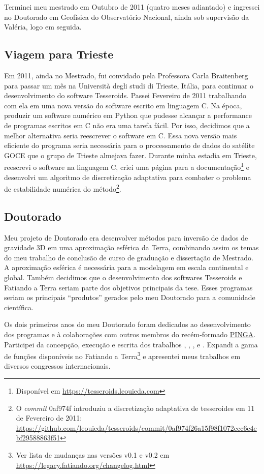 \documentclass[12pt,a4paper,oneside]{book}
\newcommand{\ON}{Observatório Nacional}
\newcommand{\Trieste}{Università degli studi di Trieste}
\begin{document}
Terminei meu mestrado em Outubro de 2011 (quatro meses adiantado) e ingressei
no Doutorado em Geofísica do \ON{}, ainda sob supervisão da
Valéria, logo em seguida.

\subsection{Viagem para Trieste}
\label{sec_triste_carla}

Em 2011, ainda no Mestrado, fui convidado pela Professora Carla Braitenberg
para passar um mês na \Trieste{}, Itália, para continuar
o desenvolvimento do software Tesseroids.
Passei Fevereiro de 2011 trabalhando com ela em uma nova versão do software
escrito em linguagem C.
Na época, produzir um software numérico em Python que pudesse alcançar a
performance de programas escritos em C não era uma tarefa fácil.
Por isso, decidimos que a melhor alternativa seria reescrever o software em C.
Essa nova versão mais eficiente do programa seria necessária para o
processamento de dados do satélite GOCE que o grupo de Trieste almejava fazer.
Durante minha estadia em Trieste, reescrevi o software na linguagem C, criei
uma página para a documentação\footnote{Disponível em \url{https://tesseroids.leouieda.com}}
e desenvolvi um algoritmo de discretização adaptativa para combater o problema
de estabilidade numérica do método\footnote{O \textit{commit} 0af974f
introduziu a discretização adaptativa de tesseroides em 11 de Fevereiro de
2011:
\url{https://github.com/leouieda/tesseroids/commit/0af974f26a15f98f1072ccc6c4ebf29588863f51}}.

\subsection{Doutorado}
\label{sec_doutorado}

Meu projeto de Doutorado era desenvolver métodos para inversão de dados de
gravidade 3D em uma aproximação esférica da Terra, combinando assim os temas
do meu trabalho de conclusão de curso de graduação e dissertação de Mestrado.
A aproximação esférica é necessária para a modelagem em escala continental e
global.
Também decidimos que o desenvolvimento dos softwares Tesseroids e Fatiando a
Terra seriam parte dos objetivos principais da tese.
Esses programas seriam os principais ``produtos'' gerados pelo meu Doutorado
para a comunidade científica.

Os dois primeiros anos do meu Doutorado foram dedicados ao desenvolvimento dos
programas e à colaborações com outros membros do recém-formado
\href{https://www.pinga-lab.org}{PINGA}.
Participei da concepção, execução e escrita dos trabalhos
\citet{OliveiraJr2013}, \citet{Melo2013}, \citet{Carlos2014},
\citet{OliveiraJr2015} e \citet{Carlos2016}.
Expandi a gama de funções disponíveis no Fatiando a Terra\footnote{Ver lista
de mudanças nas versões v0.1 e v0.2 em \url{https://legacy.fatiando.org/changelog.html}}
e apresentei meus trabalhos em diversos congressos internacionais.
\end{document}
